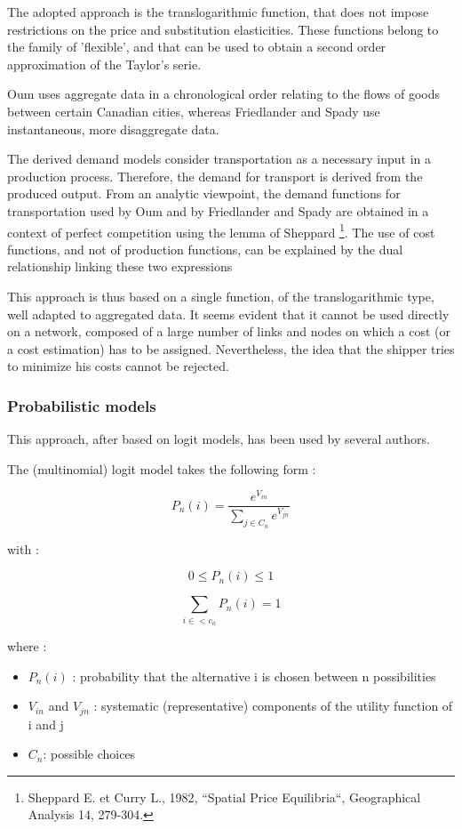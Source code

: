 The adopted approach is the translogarithmic function, that does not impose
restrictions on the price and substitution elasticities.  These functions belong
to the family of 'flexible', and that can be used to obtain a
second order approximation of the Taylor's serie.

Oum uses aggregate data in a chronological order relating to the flows of goods
between certain Canadian cities, whereas Friedlander and Spady use
instantaneous, more disaggregate data.

The derived demand models consider transportation as a necessary input in a
production process.  Therefore, the demand for transport is derived from the produced 
output. From an analytic viewpoint, the demand functions for
transportation used by Oum and by Friedlander and Spady are obtained in a
context of perfect competition using the lemma of Sheppard
\footnote{Sheppard E. et Curry L., 1982, ``Spatial Price Equilibria``,
Geographical Analysis 14, 279-304.}.  The use of cost functions, and not of
production functions, can be explained by the dual relationship linking
these two expressions

This approach is thus based on a single function, of the
translogarithmic type, well adapted to aggregated data.  It seems evident that
it cannot be used directly on a network, composed of a large number of
links and nodes on which a cost (or a cost
estimation) has to be assigned.  Nevertheless, the idea that the shipper tries
to minimize his costs cannot be rejected.





\subsubsection{Probabilistic models}


This approach, after based on logit models, has been used by several authors.

The (multinomial) logit model takes the following form :

$$P_n(i)=\frac{e^{V_{in}}}{\sum\limits_{j\in C_n}e^{V_{jn}}}$$

with :

$$0 \leq P_n(i) \leq 1$$

$$\sum \limits_{i \in <c_n}P_n(i) = 1$$


where :

\begin{itemize}
\item $P_n(i)$ : probability that the alternative i is chosen between n possibilities
\item $V_{in}$ and $V_{jn}$ : systematic (representative) components of the utility
function of i and j
\item $C_n$: possible choices
\end{itemize}

